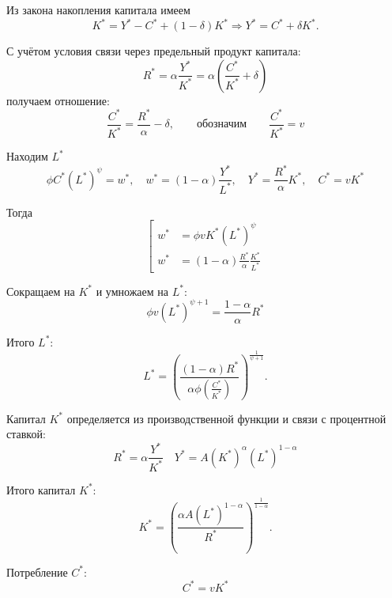 \documentclass[14pt,a4paper]{extreport}
\begin{document}
    Из закона накопления капитала имеем
    \begin{equation}
    K^*=Y^* - C^* + (1 -\delta)K^* \Rightarrow
    Y^*=C^*+\delta K^*.
    \end{equation}

    С учётом условия связи через предельный продукт капитала:
    \begin{equation}
    R^*=\alpha\frac{Y^*}{K^*} = \alpha(\frac{C^*}{K^*} + \delta)
    \end{equation}
    получаем отношение:
    \begin{equation}
    \frac{C^*}{K^*}=\frac{R^*}{\alpha}-\delta, \qquad \text{обозначим} \qquad \frac{C^*}{K^*}= v
    \end{equation}

    Находим $L^*$
    \begin{equation}
    \phi C^*(L^*)^{\psi} = w^*, \quad w^* = (1-\alpha)\frac{Y^*}{L^*}, \quad Y^* = \frac{R^*}{\alpha}K^*, \quad C^* = vK^*
    \end{equation}

    Тогда
    \[
    \left[
    \begin{aligned}
    w^* &= \phi v K^* (L^*)^{\psi} \\
    w^* &= (1-\alpha)\frac{R^*}{\alpha}\frac{K^*}{L^*}
    \end{aligned}
    \right.
    \]

    Сокращаем на $K^*$ и умножаем на $L^*$:
    \begin{equation}
    \phi v (L^*)^{\psi+1} = \frac{1 - \alpha}{\alpha}R^*
    \end{equation}

    Итого $L^*$:
    \begin{equation}
    L^*=\left(\frac{(1-\alpha)R^*}{\alpha\phi\left(\frac{C^*}{K^*}\right)}\right)^{\frac{1}{\psi+1}}.
    \end{equation}


    Капитал $K^*$ определяется из производственной функции и связи с процентной ставкой:
    \begin{equation}
    R^* = \alpha \frac{Y^*}{K^*} \quad Y^* = A(K^*)^{\alpha}(L^*)^{1 - \alpha}
    \end{equation}
    
    Итого капитал $K^*$:
    \begin{equation}
    K^*=\left(\frac{\alpha A (L^*)^{1-\alpha}}{R^*}\right)^{\frac{1}{1-\alpha}}.
    \end{equation}

    Потребление $C^*$:
    \begin{equation}
    C^*= v K^*
    \end{equation}
\end{document}
